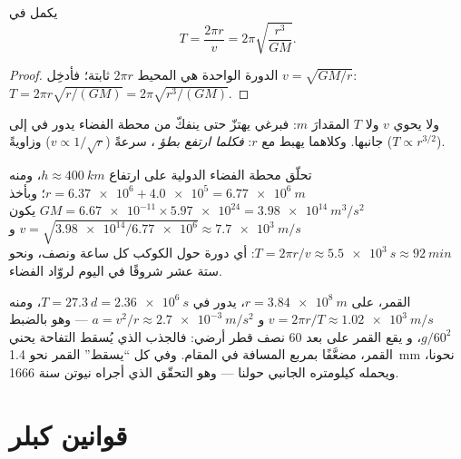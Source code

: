 \begin{proposition}\label{prop:g12:satellites-kepler:period}
يكمل   في 
\[ T = \frac{2\pi r}{v} = 2\pi \sqrt{\frac{r^3}{G M}}. \]
\end{proposition}

\begin{proof}
الدورة الواحدة هي المحيط $2\pi r$  ثابتة؛ فأدخِل
$v = \sqrt{GM/r}$: $T = 2\pi r\sqrt{r/(GM)} = 2\pi\sqrt{r^3/(GM)}$.
\end{proof}

ولا يحوي $v$ ولا $T$ المقدارَ $m$: فبرغي يهتزّ حتى ينفكّ من محطة
الفضاء يدور في  إلى جانبها. وكلاهما يهبط مع $r$:
\emph{فكلما ارتفع  بطؤ }، سرعةً
($v \propto 1/\sqrt r$) وزاويةً ($T \propto r^{3/2}$).

\begin{example}\label{ex:g12:satellites-kepler:iss}
تحلّق محطة الفضاء الدولية على ارتفاع
$h \approx \qty{400}{km}$، ومنه $r = \num{6.37e6} + \num{4.0e5} =
\qty{6.77e6}{m}$؛ وبأخذ $GM = \num{6.67e-11} \times \num{5.97e24} =
\qty{3.98e14}{m^3/s^2}$ يكون $v = \sqrt{\num{3.98e14}/\num{6.77e6}}
\approx \qty{7.7e3}{m/s}$ و$T = 2\pi r/v \approx \qty{5.5e3}{s}
\approx \qty{92}{min}$: أي دورة حول الكوكب كل ساعة ونصف،
ونحو ستة عشر شروقًا في اليوم لروّاد الفضاء.
\end{example}

\begin{example}\label{ex:g12:satellites-kepler:moon}
القمر، على $r = \qty{3.84e8}{m}$، يدور في $T = \qty{27.3}{d} =
\qty{2.36e6}{s}$، ومنه $v = 2\pi r/T \approx \qty{1.02e3}{m/s}$ و
$a = v^2/r \approx \qty{2.7e-3}{m/s^2}$ --- وهو بالضبط $g/60^2$، و
يقع القمر على بعد $60$ نصف قطر أرضي: فالجذب الذي يُسقط التفاحة
يحني القمر، مضعَّفًا بمربع المسافة في المقام. وفي كل 
``يسقط'' القمر نحو \qty{1.4}{mm} نحونا، ويحمله كيلومتره
الجانبي حولنا --- وهو التحقّق الذي أجراه نيوتن سنة 1666.
\end{example}

\section{قوانين كبلر}


